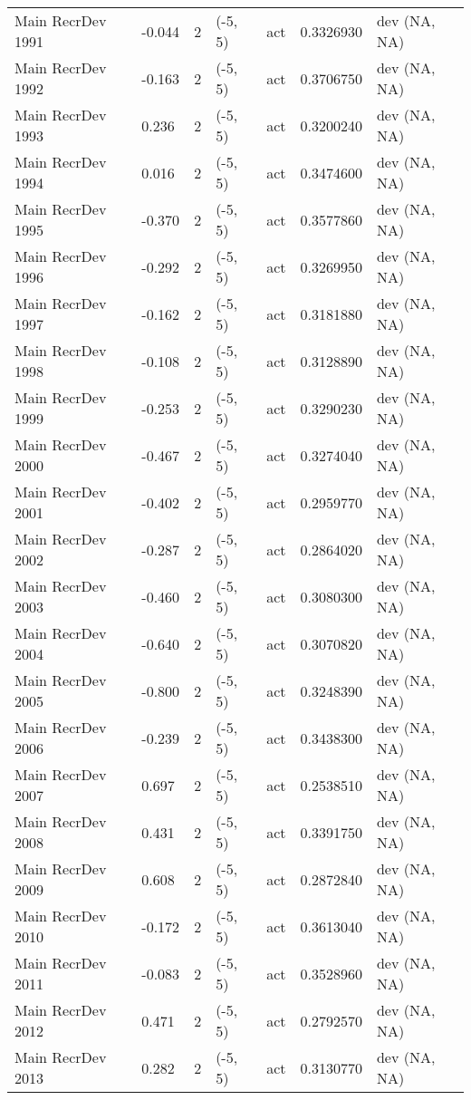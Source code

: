 \documentclass[11pt,
  english,
  letterpaper,
]{article}
\begin{document}
\begin{landscape}
\begin{longtable}[t]{>{\raggedright\arraybackslash}p{7cm}lllll>{\raggedright\arraybackslash}p{4cm}}
Main RecrDev 1991 & -0.044 & 2 & (-5, 5) & act & 0.3326930 & dev (NA, NA)\\
Main RecrDev 1992 & -0.163 & 2 & (-5, 5) & act & 0.3706750 & dev (NA, NA)\\
Main RecrDev 1993 & 0.236 & 2 & (-5, 5) & act & 0.3200240 & dev (NA, NA)\\
Main RecrDev 1994 & 0.016 & 2 & (-5, 5) & act & 0.3474600 & dev (NA, NA)\\
Main RecrDev 1995 & -0.370 & 2 & (-5, 5) & act & 0.3577860 & dev (NA, NA)\\
Main RecrDev 1996 & -0.292 & 2 & (-5, 5) & act & 0.3269950 & dev (NA, NA)\\
Main RecrDev 1997 & -0.162 & 2 & (-5, 5) & act & 0.3181880 & dev (NA, NA)\\
Main RecrDev 1998 & -0.108 & 2 & (-5, 5) & act & 0.3128890 & dev (NA, NA)\\
Main RecrDev 1999 & -0.253 & 2 & (-5, 5) & act & 0.3290230 & dev (NA, NA)\\
Main RecrDev 2000 & -0.467 & 2 & (-5, 5) & act & 0.3274040 & dev (NA, NA)\\
Main RecrDev 2001 & -0.402 & 2 & (-5, 5) & act & 0.2959770 & dev (NA, NA)\\
Main RecrDev 2002 & -0.287 & 2 & (-5, 5) & act & 0.2864020 & dev (NA, NA)\\
Main RecrDev 2003 & -0.460 & 2 & (-5, 5) & act & 0.3080300 & dev (NA, NA)\\
Main RecrDev 2004 & -0.640 & 2 & (-5, 5) & act & 0.3070820 & dev (NA, NA)\\
Main RecrDev 2005 & -0.800 & 2 & (-5, 5) & act & 0.3248390 & dev (NA, NA)\\
Main RecrDev 2006 & -0.239 & 2 & (-5, 5) & act & 0.3438300 & dev (NA, NA)\\
Main RecrDev 2007 & 0.697 & 2 & (-5, 5) & act & 0.2538510 & dev (NA, NA)\\
Main RecrDev 2008 & 0.431 & 2 & (-5, 5) & act & 0.3391750 & dev (NA, NA)\\
Main RecrDev 2009 & 0.608 & 2 & (-5, 5) & act & 0.2872840 & dev (NA, NA)\\
Main RecrDev 2010 & -0.172 & 2 & (-5, 5) & act & 0.3613040 & dev (NA, NA)\\
Main RecrDev 2011 & -0.083 & 2 & (-5, 5) & act & 0.3528960 & dev (NA, NA)\\
Main RecrDev 2012 & 0.471 & 2 & (-5, 5) & act & 0.2792570 & dev (NA, NA)\\
Main RecrDev 2013 & 0.282 & 2 & (-5, 5) & act & 0.3130770 & dev (NA, NA)\\

\end{longtable}
\end{landscape}
\end{document}
